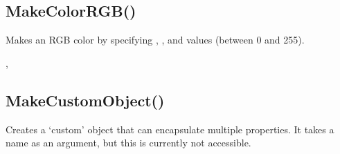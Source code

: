 \documentclass[letterpaper,10pt,english]{sphinxmanual}
\begin{document}
\ignorespaces 

\subsection{MakeColorRGB()}
\label{\detokenize{reference/peblobjects:makecolorrgb}}\label{\detokenize{reference/peblobjects:index-23}}
\sphinxAtStartPar
{}

\sphinxAtStartPar
{}

\sphinxAtStartPar
Makes an RGB color by specifying ,   , and  values (between 0 and 255).

\sphinxAtStartPar
{}

\begin{sphinxVerbatim}[commandchars=\\\{\}]
\end{sphinxVerbatim}

\sphinxAtStartPar
{}

\sphinxAtStartPar
{}, 

\ignorespaces 

\subsection{MakeCustomObject()}
\label{\detokenize{reference/peblobjects:makecustomobject}}\label{\detokenize{reference/peblobjects:index-24}}
\sphinxAtStartPar
{}

\sphinxAtStartPar
{}

\sphinxAtStartPar
Creates a ‘custom’ object that can encapsulate multiple properties. It takes a name as an argument, but this is currently not accessible.

\sphinxAtStartPar
{}
\end{document}
